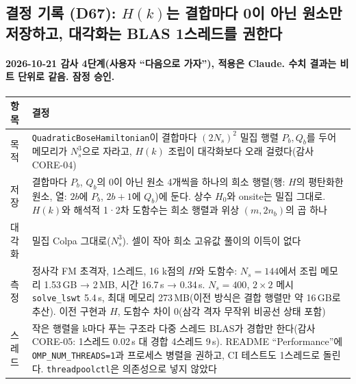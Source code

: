 \subsection{결정 기록 (D67): $H(k)$는 결합마다 0이 아닌 원소만 저장하고, 대각화는 BLAS 1스레드를 권한다}\label{decisions-d67-sparse-assembly}
\begingroup%
  \framesubtitle{2026-10-21 감사 4단계(사용자 ``다음으로 가자''), 적용은 Claude. 수치 결과는 비트 단위로 같음. 잠정 승인.}
  \small\renewcommand{\arraystretch}{1.12}
  \begin{tabularx}{\textwidth}{@{}P{3.0cm}Y@{}}
    \toprule
    항목 & 결정 \\
    \midrule
    목적 & \texttt{QuadraticBoseHamiltonian}이 결합마다 $(2N_s)^2$ 밀집 행렬 $P_b,Q_b$를 두어 메모리가 $N_s^3$으로 자라고, $H(k)$ 조립이 대각화보다 오래 걸렸다(감사 CORE-04) \\
    저장 & 결합마다 $P_b$, $Q_b$의 0이 아닌 원소 4개씩을 하나의 희소 행렬(행: $H$의 평탄화한 원소, 열: $2b$에 $P_b$, $2b+1$에 $Q_b$)에 둔다. 상수 $H_0$와 onsite는 밀집 그대로. $H(k)$와 해석적 1·2차 도함수는 희소 행렬과 위상 $(m,2n_b)$의 곱 하나 \\
    대각화 & 밀집 Colpa 그대로($N_s^3$). 셀이 작아 희소 고유값 풀이의 이득이 없다 \\
    측정 & 정사각 FM 초격자, 1스레드, 16 k점의 $H$와 도함수: $N_s=144$에서 조립 메모리 1.53\,GB → 2\,MB, 시간 16.7\,s → 0.34\,s. $N_s=400$, $2\times2$ 메시 \texttt{solve\_lswt} 5.4\,s, 최대 메모리 273\,MB(이전 방식은 결합 행렬만 약 16\,GB로 추산). 이전 구현과 $H$, 도함수 차이 0(삼각 격자 무작위 비공선 상태 포함) \\
    스레드 & 작은 행렬을 k마다 푸는 구조라 다중 스레드 BLAS가 경합만 한다(감사 CORE-05: 1스레드 0.02\,s 대 경합 4스레드 9\,s). README ``Performance''에 \texttt{OMP\_NUM\_THREADS=1}과 프로세스 병렬을 권하고, CI 테스트도 1스레드로 돌린다. \texttt{threadpoolctl}은 의존성으로 넣지 않았다 \\
    \bottomrule
  \end{tabularx}
\endgroup

